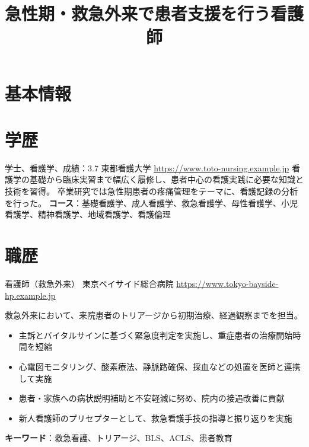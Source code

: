 \documentclass[a4paper, serif, 10pt]{moderncv}
\title{急性期・救急外来で患者支援を行う看護師}
\begin{document}
\maketitle

\section{基本情報}

\section{学歴}

        {学士、看護学、成績：3.7}
        {東都看護大学}
        {\url{https://www.toto-nursing.example.jp}}
        {}
        {看護学の基礎から臨床実習まで幅広く履修し、患者中心の看護実践に必要な知識と技術を習得。
卒業研究では急性期患者の疼痛管理をテーマに、看護記録の分析を行った。
\textbf{コース}：基礎看護学、成人看護学、救急看護学、母性看護学、小児看護学、精神看護学、地域看護学、看護倫理}
\section{職歴}

        {看護師（救急外来）}
        {東京ベイサイド総合病院}
        {\url{https://www.tokyo-bayside-hp.example.jp}}
        {}
        {救急外来において、来院患者のトリアージから初期治療、経過観察までを担当。
%
\begin{itemize}
\item 主訴とバイタルサインに基づく緊急度判定を実施し、重症患者の治療開始時間を短縮
\item 心電図モニタリング、酸素療法、静脈路確保、採血などの処置を医師と連携して実施
\item 患者・家族への病状説明補助と不安軽減に努め、院内の接遇改善に貢献
\item 新人看護師のプリセプターとして、救急看護手技の指導と振り返りを実施
\end{itemize}
\textbf{キーワード}：救急看護、トリアージ、BLS、ACLS、患者教育}
\end{document}
